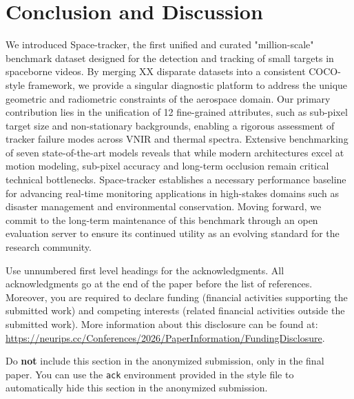 \documentclass{article}
\begin{document}
\begin{table}[t]
  \centering
  \caption{Multi-Object Tracking results on Space-Tracker-MOT, split by detector
  family. The \textbf{left half} reports the car-only setting, pooled across
  RsCarData, SAT-MTB-car, and SDM-Car, all driven by a shared HiEUM detection
  cache. The \textbf{right half} reports the airplane / ship / train setting,
  pooled across SAT-MTB (test split, held out from detector training), VISO,
  and AIR-MOT-100, all driven by a shared Faster~R-CNN. Rate metrics (HOTA,
  DetA, AssA, MOTA, IDF1) are macro-averaged across the constituent splits;
  count metrics (IDsw, MT, ML) are summed. $\uparrow$~higher is better,
  $\downarrow$~lower is better. \textbf{Bold} = best, \underline{underline} =
  second best within each column, computed independently within each half.}
  \label{tab:mot_results_combined}
  
\end{table}

\section{Conclusion and Discussion}
We introduced Space-tracker, the first unified and curated "million-scale"
benchmark dataset designed for the detection and tracking of small targets in
spaceborne videos. By merging XX disparate datasets into a consistent COCO-style
framework, we provide a singular diagnostic platform to address the unique
geometric and radiometric constraints of the aerospace domain. Our primary
contribution lies in the unification of 12 fine-grained attributes, such as
sub-pixel target size and non-stationary backgrounds, enabling a rigorous
assessment of tracker failure modes across VNIR and thermal spectra. Extensive
benchmarking of seven state-of-the-art models reveals that while modern
architectures excel at motion modeling, sub-pixel accuracy and long-term
occlusion remain critical technical bottlenecks. Space-tracker establishes a
necessary performance baseline for advancing real-time monitoring applications
in high-stakes domains such as disaster management and environmental
conservation. Moving forward, we commit to the long-term maintenance of this
benchmark through an open evaluation server to ensure its continued utility as
an evolving standard for the research community.


\begin{ack}
Use unnumbered first level headings for the acknowledgments. All acknowledgments
go at the end of the paper before the list of references. Moreover, you are
required to declare funding (financial activities supporting the submitted work)
and competing interests (related financial activities outside the submitted
work). More information about this disclosure can be found at:
\url{https://neurips.cc/Conferences/2026/PaperInformation/FundingDisclosure}.


Do {\bf not} include this section in the anonymized submission, only in the
final paper. You can use the \texttt{ack} environment provided in the style file
to automatically hide this section in the anonymized submission.
\end{ack}
\end{document}
